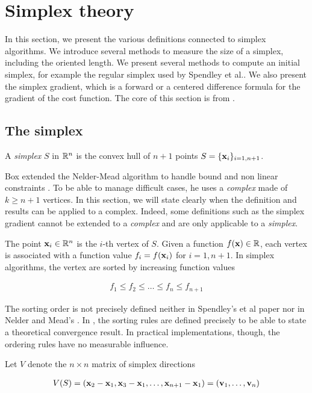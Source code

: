 \chapter{Simplex theory}

In this section, we present the various definitions connected
to simplex algorithms. We introduce several methods to measure 
the size of a simplex, including the oriented length. 
We present several methods to compute an
initial simplex, for example the regular simplex used by Spendley et al..
We also present the simplex gradient, which is a forward or a centered 
difference formula for the gradient of the cost function.
The core of this section is from \cite{Kelley1999}.

\section{The simplex}

A \emph{simplex} $S$ in $\mathbb{R}^n$ is the convex hull of $n+1$ points $S=\{\mathbf{x}_i\}_{i=1,n+1}$.

Box extended the Nelder-Mead algorithm to handle bound and non linear constraints \cite{Box1965}.
To be able to manage difficult cases, he uses a \emph{complex} made of $k\geq n+1$ vertices.
In this section, we will state clearly when the definition and results can be applied to a complex. 
Indeed, some definitions such as the simplex gradient cannot be extended to a \emph{complex}
and are only applicable to a \emph{simplex}.

The point $\mathbf{x}_i\in\mathbb{R}^n$ is the $i$-th vertex of $S$. Given a function $f(\mathbf{x})\in\mathbb{R}$,
each vertex is associated with a function value $f_i = f(\mathbf{x}_i)$ for $i=1,n+1$.
In simplex algorithms, the vertex are sorted by increasing function values 

\begin{eqnarray}
\label{simplex-sortedfv}
f_1 \leq f_2 \leq \ldots \leq f_n \leq f_{n+1}
\end{eqnarray}

The sorting order is not precisely defined neither in Spendley's et al paper \cite{Spendley1962}
nor in Nelder and Mead's \cite{citeulike:3009487}. 
In \cite{lagarias:112}, the sorting rules are defined precisely to be able to 
state a theoretical convergence result. In practical implementations, though, the 
ordering rules have no measurable influence.

Let $V$ denote the $n\times n$ matrix of simplex directions 

\begin{eqnarray}
\label{simplex-directions}
V(S) = (\mathbf{x}_2 - \mathbf{x}_1, \mathbf{x}_3 - \mathbf{x}_1 , \ldots , \mathbf{x}_{n+1} - \mathbf{x}_1) = (\mathbf{v}_1, \ldots , \mathbf{v}_n)
\end{eqnarray}

